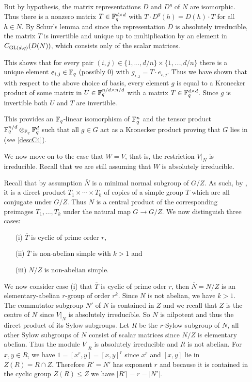But by hypothesis, the matrix representations $D$ and $D^g$ of $N$
are isomorphic. Thus there is a nonzero matrix $T \in \mathbb{F}_q^{d \times d}$ with
$T \cdot D^g(h) = D(h) \cdot T$ for all $h \in N$. By Schur's lemma and
since the representation $D$ is absolutely irreducible,
the matrix $T$ is invertible and unique 
up to multiplication by an element in $C_{\GL(d,q)}(D(N))$, which
consists only of the scalar matrices.

This shows that for every pair $(i,j) \in \{ 1, \ldots, d/n \} \times 
\{ 1, \ldots, d/n \}$ there
is a unique element $e_{i,j} \in \mathbb{F}_q$ (possibly $0$) with 
$g_{i,j} = T \cdot e_{i,j}$. Thus we have shown that with respect to
the above choice of basis, every element $g$ is equal to a Kronecker 
product of some matrix in $U \in \mathbb{F}_q^{n/d \times n/d}$ with a matrix
$T \in \mathbb{F}_q^{d \times d}$. Since $g$ is invertible both 
$U$ and $T$ are invertible. 

This provides an $\mathbb{F}_q$-linear isomorphism of 
$\mathbb{F}_q^n$ and the tensor product $\mathbb{F}_q^{n/d} \otimes_{\mathbb{F}_q} \mathbb{F}_q^d$
such that all $g \in G$ act as a Kronecker product proving that
$G$ lies in  (see \ref{descC4}).

We now move on to the case that $W = V$, that is, the restriction
$V|_N$ is irreducible. Recall that we are still assuming that $W$ is
absolutely irreducible.

Recall that by assumption $\bar N$ is a minimal normal subgroup of $G/Z$.
As such, by \cite[Theorem 4.3A.(iii)]{DixonMort}, it is
a direct product $\bar T_1 \times \cdots \times \bar T_k$ of copies of a 
simple group $\bar T$ which are all conjugate under $G/Z$. Thus $N$ is
a central product of the corresponding preimages $T_1, \ldots, T_k$
under the natural map $G \to G/Z$. We now distinguish three cases:
\begin{itemize}\setlength{\itemsep}{0pt}\setlength{\parskip}{0pt}
\item[(i)] $\bar T$ is cyclic of prime order $r$, 
\item[(ii)] $\bar T$ is non-abelian simple with $k > 1$ and
\item[(iii)] $N/Z$ is non-abelian simple.
\end{itemize}
We now consider case (i) that $\bar T$ is cyclic of prime oder $r$, then
$\bar N = N/Z$ is an elementary-abelian $r$-group of order $r^k$.
Since $N$ is not abelian, we have $k > 1$.
The commutator subgroup $N'$ of $N$ is contained in $Z$ and
we recall that $Z$ is the centre of $N$ since $V|_N$ is absolutely
irreducible. So $N$ is nilpotent and thus the direct product of its
Sylow subgroups. Let $R$ be the $r$-Sylow subgroup of $N$, all other
Sylow subgroups of $N$ consist of scalar matrices since $N/Z$ is
elementary abelian. Thus the module $V|_R$ is absolutely irreducible
and $R$ is not abelian.
For $x,y \in R$, we have $1 = [x^r,y] = [x,y]^r$ since $x^r$ and 
$[x,y]$ lie in $Z(R) = R \cap Z$. Therefore $R'=N'$ has exponent $r$ and
because it is contained in the cyclic group $Z(R) \le Z$ we have $|R'| =
r = |N'|$.

